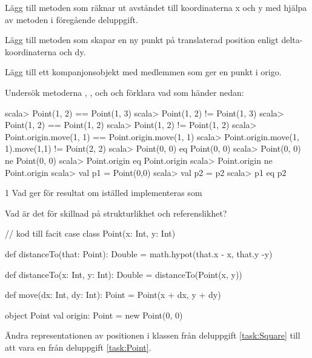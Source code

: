 \Subtask Lägg till metoden  som räknar ut avståndet till koordinaterna x och y med hjälpa av metoden i föregående deluppgift.

\Subtask Lägg till metoden  som skapar en ny punkt på translaterad position enligt delta-koordinaterna  och {dy}.

\Subtask Lägg till ett kompanjonsobjekt med medlemmen  som ger en punkt i origo.

\Subtask Undersök metoderna \code{==}, \code{!=},  och  och förklara vad som händer nedan:
\begin{REPL}
scala> Point(1, 2) == Point(1, 3)
scala> Point(1, 2) != Point(1, 3)
scala> Point(1, 2) == Point(1, 2)
scala> Point(1, 2) != Point(1, 2)
scala> Point.origin.move(1, 1) == Point.origin.move(1, 1)
scala> Point.origin.move(1, 1).move(1,1) != Point(2, 2)
scala> Point(0, 0) eq Point(0, 0)
scala> Point(0, 0) ne Point(0, 0)
scala> Point.origin eq Point.origin
scala> Point.origin ne Point.origin
scala> val p1 = Point(0,0)
scala> val p2 = p2
scala> p1 eq p2
\end{REPL}
1
\Subtask Vad ger  för resultat om  iställed  implementeras som 

\Subtask\Pen Vad är det för skillnad på strukturlikhet och referenslikhet?

\begin{CodeSmall}
// kod till facit
case class Point(x: Int, y: Int) {
  def distanceTo(that: Point): Double = math.hypot(that.x - x, that.y -y)
  
  def distanceTo(x: Int, y: Int): Double = distanceTo(Point(x, y)) 
  
  def move(dx: Int, dy: Int): Point = Point(x + dx, y + dy)
}

object Point {
  val origin: Point = new Point(0, 0)
}
\end{CodeSmall}


\Task Ändra representationen av positionen i klassen  från deluppgift \ref{task:Square} till att vara en  från deluppgift \ref{task:Point}.


